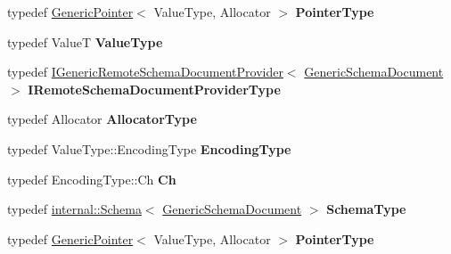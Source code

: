 \begin{DoxyCompactItemize}
\item 
typedef \hyperlink{class_generic_pointer}{Generic\+Pointer}$<$ Value\+Type, Allocator $>$ {\bfseries Pointer\+Type}\hypertarget{class_generic_schema_document_aeb62f562d4dc024402b00f97cbcef747}{}\label{class_generic_schema_document_aeb62f562d4dc024402b00f97cbcef747}

\item 
typedef ValueT {\bfseries Value\+Type}\hypertarget{class_generic_schema_document_ae246f1b6573a5a8a2c0d73d4eb64d53a}{}\label{class_generic_schema_document_ae246f1b6573a5a8a2c0d73d4eb64d53a}

\item 
typedef \hyperlink{class_i_generic_remote_schema_document_provider}{I\+Generic\+Remote\+Schema\+Document\+Provider}$<$ \hyperlink{class_generic_schema_document}{Generic\+Schema\+Document} $>$ {\bfseries I\+Remote\+Schema\+Document\+Provider\+Type}\hypertarget{class_generic_schema_document_aa53ca323efce50f88aea6fa0d03e9785}{}\label{class_generic_schema_document_aa53ca323efce50f88aea6fa0d03e9785}

\item 
typedef Allocator {\bfseries Allocator\+Type}\hypertarget{class_generic_schema_document_ac0d88adf8c86917d8bc9563ffdab6a6d}{}\label{class_generic_schema_document_ac0d88adf8c86917d8bc9563ffdab6a6d}

\item 
typedef Value\+Type\+::\+Encoding\+Type {\bfseries Encoding\+Type}\hypertarget{class_generic_schema_document_ad0293c28c9ffe80ab1f8ec86efee35c8}{}\label{class_generic_schema_document_ad0293c28c9ffe80ab1f8ec86efee35c8}

\item 
typedef Encoding\+Type\+::\+Ch {\bfseries Ch}\hypertarget{class_generic_schema_document_ab1dec56a78b29649eb8e4b85b101ec7c}{}\label{class_generic_schema_document_ab1dec56a78b29649eb8e4b85b101ec7c}

\item 
typedef \hyperlink{classinternal_1_1_schema}{internal\+::\+Schema}$<$ \hyperlink{class_generic_schema_document}{Generic\+Schema\+Document} $>$ {\bfseries Schema\+Type}\hypertarget{class_generic_schema_document_acaf115202b159a2eb72c97c3dc6c3895}{}\label{class_generic_schema_document_acaf115202b159a2eb72c97c3dc6c3895}

\item 
typedef \hyperlink{class_generic_pointer}{Generic\+Pointer}$<$ Value\+Type, Allocator $>$ {\bfseries Pointer\+Type}\hypertarget{class_generic_schema_document_aeb62f562d4dc024402b00f97cbcef747}{}\label{class_generic_schema_document_aeb62f562d4dc024402b00f97cbcef747}

\end{DoxyCompactItemize}
